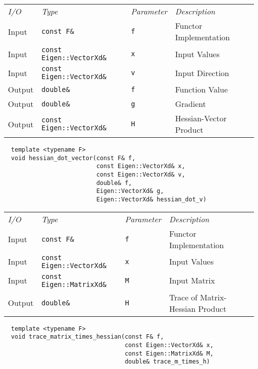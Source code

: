 \begin{tcolorbox}[colback=white,colframe=gray90, coltitle=black,boxrule=3pt,
fonttitle=\bfseries,title=Hessian-Vector Product]

\begin{tabular}{llll}
\textit{I/O} & \textit{Type} & \textit{Parameter} & \textit{Description} \\
Input & \texttt{const F\&} & \texttt{f} & Functor Implementation \\
Input & \texttt{const Eigen::VectorXd\&} & \texttt{x} & Input Values \\
Input & \texttt{const Eigen::VectorXd\&} & \texttt{v} & Input Direction \\
Output & \texttt{double\&} & \texttt{f} & Function Value \\
Output & \texttt{double\&} & \texttt{g} & Gradient \\
Output & \texttt{const Eigen::VectorXd\&} & \texttt{H} & Hessian-Vector Product
\end{tabular}

\vspace{5mm}

\begin{verbatim}
  template <typename F>
  void hessian_dot_vector(const F& f,
                          const Eigen::VectorXd& x,
                          const Eigen::VectorXd& v,
                          double& f,
                          Eigen::VectorXd& g,
                          Eigen::VectorXd& hessian_dot_v)
\end{verbatim}

\end{tcolorbox}

\begin{tcolorbox}[colback=white,colframe=gray90, coltitle=black,boxrule=3pt,
fonttitle=\bfseries,title=Trace of Matrix-Hessian Product]

\begin{tabular}{llll}
\textit{I/O} & \textit{Type} & \textit{Parameter} & \textit{Description} \\
Input & \texttt{const F\&} & \texttt{f} & Functor Implementation \\
Input & \texttt{const Eigen::VectorXd\&} & \texttt{x} & Input Values \\
Input & \texttt{const Eigen::MatrixXd\&} & \texttt{M} & Input Matrix \\
Output & \texttt{double\&} & \texttt{H} & Trace of Matrix-Hessian Product
\end{tabular}

\vspace{5mm}

\begin{verbatim}
  template <typename F>
  void trace_matrix_times_hessian(const F& f,
                                  const Eigen::VectorXd& x,
                                  const Eigen::MatrixXd& M,
                                  double& trace_m_times_h)
\end{verbatim}

\end{tcolorbox}

